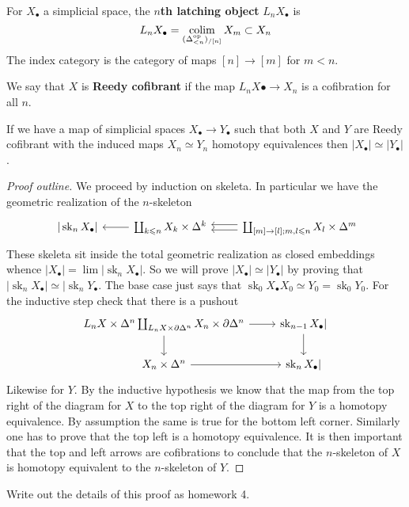 \documentclass{amsart}
\DeclareMathOperator{\sk}{sk}
\begin{document}
\begin{definition}
    For $X_\bullet$ a simplicial space, the \textbf{$n$th latching object} $L_nX_\bullet$ is
    \begin{equation}
        L_nX_\bullet = \operatorname*{colim}_{(\Delta^\text{op}_{<n})_{/[n]}} X_m \subset X_n
    \end{equation}
    The index category is the category of maps $[n]\to [m]$ for $m<n$. 

    We say that $X$ is \textbf{Reedy cofibrant} if the map $L_nX\bullet\to X_n$
    is a cofibration for all $n$.
\end{definition}

\begin{lemma}
    If we have a map of simplicial spaces $X_\bullet\to Y_\bullet$ such that both $X$
    and $Y$ are Reedy cofibrant with the induced maps $X_n\simeq Y_n$ homotopy equivalences
    then $|X_\bullet|\simeq |Y_\bullet|$.
\end{lemma}
\begin{proof}[Proof outline]
    We proceed by induction on skeleta. In particular we have the geometric realization
    of the $n$-skeleton
    \begin{equation*}
        \begin{tikzcd}
            \;|\sk_n X_\bullet | & \coprod_{k\leqslant n}X_k\times \Delta^k\lar & \coprod_{[m]\to[l]; m,l\leqslant n}X_l\times \Delta^m\ar[l,shift left]\ar[l, shift right]
        \end{tikzcd}
    \end{equation*}
    These skeleta sit inside the total geometric realization as closed embeddings whence
    $|X_\bullet| = \lim |\sk_n X_\bullet|$. So we will prove $|X_\bullet|\simeq |Y_\bullet|$
    by proving that $|\sk_n X_\bullet|\simeq|\sk_n Y_\bullet$. The base case just says that
    $\sk_0X_\bullet X_0\simeq Y_0 = \sk_0 Y_0$. For the inductive step check that
    there is a pushout
    \begin{equation*}
        \begin{tikzcd}
            L_nX\times \Delta^n\coprod_{L_n X\times\partial \Delta^n} X_n\times\partial\Delta^n \rar\dar & \sk_{n-1} X_\bullet|\dar \\
            X_n\times\Delta^n \rar & \sk_n X_\bullet|
        \end{tikzcd}
    \end{equation*}
    Likewise for $Y$. By the inductive hypothesis we know that the map from the
    top right of the diagram for $X$ to the top right of the diagram for $Y$ is a homotopy
    equivalence. By assumption the same is true for the bottom left corner. Similarly
    one has to prove that the top left is a homotopy equivalence. It is then important that
    the top and left arrows are cofibrations to conclude that the $n$-skeleton of $X$
    is homotopy equivalent to the $n$-skeleton of $Y$.
\end{proof}
Write out the details of this proof as homework 4.
\end{document}
